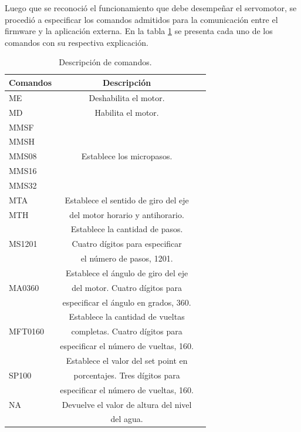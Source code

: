 Luego que se reconoció el funcionamiento que debe desempeñar el servomotor, se procedió a especificar los comandos admitidos para la comunicación entre el firmware y la aplicación externa. En la tabla \ref{tab:descripción de comandos} se presenta cada uno de los comandos con su respectiva explicación.  

\begin{table}[H]
\centering
\caption[Descripción de comandos]{Descripción de comandos.}
\begin{tabular}{l c c}
\toprule
\textbf{Comandos} & \textbf{Descripción} \\
\midrule
ME & Deshabilita el motor.\\
MD & Habilita el motor. \\
\midrule
MMSF \\
MMSH \\
MMS08 & Establece los micropasos.\\
MMS16\\
MMS32\\
\midrule
MTA & Establece el sentido de giro del eje\\
MTH & del motor horario y antihorario.\\
\midrule
       & Establece la cantidad de pasos.\\
MS1201 & Cuatro dígitos para especificar\\
       & el número de pasos, 1201.\\
\midrule
       & Establece el ángulo de giro del eje\\ 
MA0360 & del motor. Cuatro dígitos para\\
       &  especificar el ángulo en grados, 360.\\
\midrule
        & Establece la cantidad de vueltas \\ 
MFT0160 & completas. Cuatro dígitos para  \\
        & especificar el número de vueltas, 160.\\
\midrule
        & Establece el valor del set point en \\ 
SP100   & porcentajes. Tres dígitos para\\
        & especificar el número de vueltas, 160.\\
\midrule
NA & Devuelve el valor de altura del nivel\\
   &    	      del agua.\\
\bottomrule
\hline
\end{tabular}
\label{tab:descripción de comandos}
\end{table}

